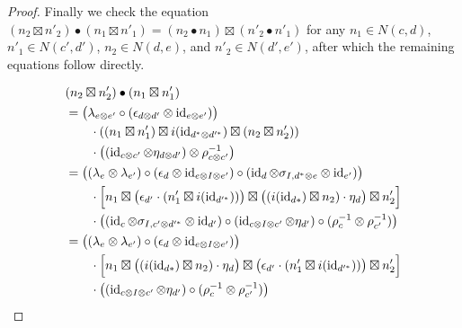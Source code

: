 \documentclass[11pt,oneside,article]{memoir}
\begin{document}
\begin{proof}
   Finally we check the equation $(n_2\boxtimes n'_2)\bullet(n_1\boxtimes n'_1)=(n_2\bullet n_1)\boxtimes(n'_2\bullet n'_1)$ for any $n_1\in N(c,d)$, $n'_1\in N(c',d')$, $n_2\in N(d,e)$, and $n'_2\in N(d',e')$, after which the remaining equations follow directly.


   \begin{align*}
      &(n_2\boxtimes n'_2)\bullet(n_1\boxtimes n'_1) \\
      &= \bigl(\lambda_{e\otimes e'}\circ(\epsilon_{d\otimes d'}\otimes\id_{e\otimes e'})\bigr) \\
      &\qquad \cdot\left((n_1\boxtimes n'_1)\boxtimes i(\id_{d^*\otimes d'^{*}})\boxtimes(n_2\boxtimes n'_2)\right) \\
      &\qquad \cdot\left((\id_{c\otimes c'}\otimes\eta_{d\otimes d'})\otimes\rho_{c\otimes c'}^{-1}\right)\\
      &= \bigl((\lambda_e\otimes\lambda_{e'})\circ(\epsilon_d\otimes\id_{e\otimes I\otimes e'})\circ(\id_d\otimes\sigma_{I,d^*\otimes e}\otimes\id_{e'})\bigr) \\
      &\qquad \cdot\Bigl[n_1\boxtimes\bigl(\epsilon_{d'}\cdot(n'_1\boxtimes i(\id_{d'^{*}}))\bigr)\boxtimes\bigl((i(\id_{d*})\boxtimes n_2)\cdot\eta_d\bigr)\boxtimes n'_2\Bigr] \\
      &\qquad \cdot\bigl((\id_c\otimes\sigma_{I,c'\otimes d'^*}\otimes\id_{d'})\circ(\id_{c\otimes I\otimes c'}\otimes\eta_{d'})\circ(\rho_c^{-1}\otimes\rho_{c'}^{-1})\bigr) \\
      &= \bigl((\lambda_e\otimes\lambda_{e'})\circ(\epsilon_d\otimes\id_{e\otimes I\otimes e'})\bigr) \\
      &\qquad \cdot\Bigl[n_1\boxtimes\bigl((i(\id_{d*})\boxtimes n_2)\cdot\eta_d\bigr)\boxtimes\bigl(\epsilon_{d'}\cdot(n'_1\boxtimes i(\id_{d'^{*}}))\bigr)\boxtimes n'_2\Bigr] \\
      &\qquad \cdot\bigl((\id_{c\otimes I\otimes c'}\otimes\eta_{d'})\circ(\rho_c^{-1}\otimes\rho_{c'}^{-1})\bigr) \\

\end{align*}
\end{proof}
\end{document}
